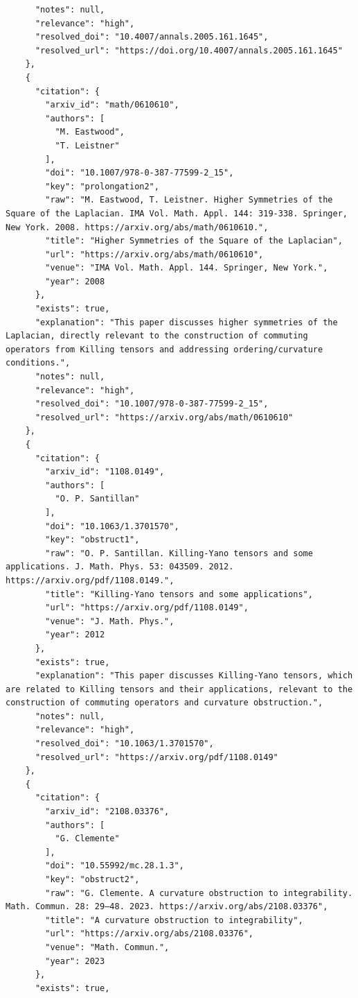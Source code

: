 \documentclass[11pt]{article}
\begin{document}
\begin{verbatim}
      "notes": null,
      "relevance": "high",
      "resolved_doi": "10.4007/annals.2005.161.1645",
      "resolved_url": "https://doi.org/10.4007/annals.2005.161.1645"
    },
    {
      "citation": {
        "arxiv_id": "math/0610610",
        "authors": [
          "M. Eastwood",
          "T. Leistner"
        ],
        "doi": "10.1007/978-0-387-77599-2_15",
        "key": "prolongation2",
        "raw": "M. Eastwood, T. Leistner. Higher Symmetries of the Square of the Laplacian. IMA Vol. Math. Appl. 144: 319-338. Springer, New York. 2008. https://arxiv.org/abs/math/0610610.",
        "title": "Higher Symmetries of the Square of the Laplacian",
        "url": "https://arxiv.org/abs/math/0610610",
        "venue": "IMA Vol. Math. Appl. 144. Springer, New York.",
        "year": 2008
      },
      "exists": true,
      "explanation": "This paper discusses higher symmetries of the Laplacian, directly relevant to the construction of commuting operators from Killing tensors and addressing ordering/curvature conditions.",
      "notes": null,
      "relevance": "high",
      "resolved_doi": "10.1007/978-0-387-77599-2_15",
      "resolved_url": "https://arxiv.org/abs/math/0610610"
    },
    {
      "citation": {
        "arxiv_id": "1108.0149",
        "authors": [
          "O. P. Santillan"
        ],
        "doi": "10.1063/1.3701570",
        "key": "obstruct1",
        "raw": "O. P. Santillan. Killing-Yano tensors and some applications. J. Math. Phys. 53: 043509. 2012. https://arxiv.org/pdf/1108.0149.",
        "title": "Killing-Yano tensors and some applications",
        "url": "https://arxiv.org/pdf/1108.0149",
        "venue": "J. Math. Phys.",
        "year": 2012
      },
      "exists": true,
      "explanation": "This paper discusses Killing-Yano tensors, which are related to Killing tensors and their applications, relevant to the construction of commuting operators and curvature obstruction.",
      "notes": null,
      "relevance": "high",
      "resolved_doi": "10.1063/1.3701570",
      "resolved_url": "https://arxiv.org/pdf/1108.0149"
    },
    {
      "citation": {
        "arxiv_id": "2108.03376",
        "authors": [
          "G. Clemente"
        ],
        "doi": "10.55992/mc.28.1.3",
        "key": "obstruct2",
        "raw": "G. Clemente. A curvature obstruction to integrability. Math. Commun. 28: 29–48. 2023. https://arxiv.org/abs/2108.03376",
        "title": "A curvature obstruction to integrability",
        "url": "https://arxiv.org/abs/2108.03376",
        "venue": "Math. Commun.",
        "year": 2023
      },
      "exists": true,

\end{verbatim}
\end{document}
